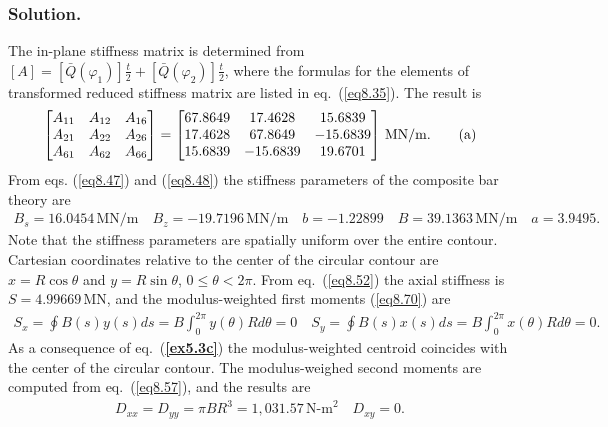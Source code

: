 \documentclass{AeroStructure-ERJohnson}
\begin{document}
\begin{example}
\subsubsection{Solution.} The in-plane stiffness matrix is
determined from $[A]=\left[\bar{Q}\left(\varphi_{1}\right)\right]\!
\frac{t}{2}+\left[\bar{Q}\left(\varphi_{2}\right)\right]\!\frac{t}{2}$, where the formulas for the elements of transformed
reduced stiffness matrix are listed in eq.~(\ref{eq8.35}). The
result is
\begin{align}\label{ex5.3a}
\left[\begin{array}{@{}ccc@{}}A_{11} & A_{12} & A_{16}\\
A_{21} & A_{22} & A_{26}\\
A_{61} & A_{62} &
A_{66}\end{array}\right]=\left[\begin{array}{@{}ccc@{}}67.8649 &
17.4628 & 15.6839\\
17.4628 & 67.8649 & -15.6839\\
15.6839 &
-15.6839 & 19.6701\end{array}\right]\,\mathrm{MN}/
\mathrm{m}.\tag{a}
\end{align}
From eqs. (\ref{eq8.47}) and (\ref{eq8.48}) the stiffness
parameters of the composite bar theory are
\begin{align}\label{ex5.3b}
B_{s}=16.0454\,\mathrm{MN}/\mathrm{m} \quad B_{z}=-19.7196\,\mathrm{MN}/\mathrm{m} \quad b=-1.22899 \quad B=39.1363\,\mathrm{MN}/\mathrm{m} \quad a=3.9495.\tag{b}
\end{align}
Note that the stiffness parameters are spatially uniform over the
entire contour. Cartesian coordinates relative to the center of
the circular contour are $x=R \cos \theta$ and $y=R \sin \theta$,
$0 \leq \theta<2 \pi$. From eq.~(\ref{eq8.52}) the axial stiffness
is $S=4.99669\,\mathrm{MN}$, and the modulus-weighted first moments
(\ref{eq8.70}) are
\begin{align}\label{ex5.3c}
S_{x}=\oint B(s) y(s) d s=B \int_{0}^{2 \pi} y(\theta) R d
\theta=0 \quad S_{y}=\oint B(s) x(s) d s=B \int_{0}^{2 \pi}
x(\theta) R d \theta=0.\tag{c}
\end{align}
As a consequence of eq.~(\textbf{\ref{ex5.3c}}) the modulus-weighted
centroid coincides with the center of the circular contour. The
modulus-weighed second moments are computed from
eq.~(\ref{eq8.57}), and the results are
\begin{align}\label{ex5.3d}
D_{x x}=D_{y y}=\pi B R^{3}=1,031.57\,\textrm{N-m}^{2}
\quad D_{x y}=0.\tag{d}
\end{align}

\end{example}
\end{document}
